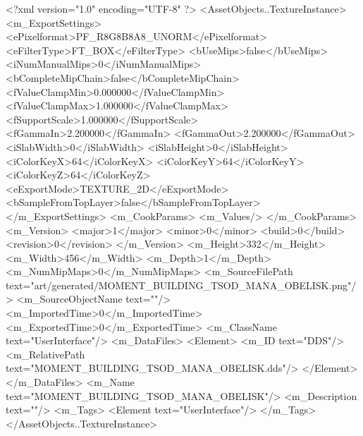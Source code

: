 <?xml version="1.0" encoding="UTF-8" ?>
<AssetObjects..TextureInstance>
	<m_ExportSettings>
		<ePixelformat>PF_R8G8B8A8_UNORM</ePixelformat>
		<eFilterType>FT_BOX</eFilterType>
		<bUseMips>false</bUseMips>
		<iNumManualMips>0</iNumManualMips>
		<bCompleteMipChain>false</bCompleteMipChain>
		<fValueClampMin>0.000000</fValueClampMin>
		<fValueClampMax>1.000000</fValueClampMax>
		<fSupportScale>1.000000</fSupportScale>
		<fGammaIn>2.200000</fGammaIn>
		<fGammaOut>2.200000</fGammaOut>
		<iSlabWidth>0</iSlabWidth>
		<iSlabHeight>0</iSlabHeight>
		<iColorKeyX>64</iColorKeyX>
		<iColorKeyY>64</iColorKeyY>
		<iColorKeyZ>64</iColorKeyZ>
		<eExportMode>TEXTURE_2D</eExportMode>
		<bSampleFromTopLayer>false</bSampleFromTopLayer>
	</m_ExportSettings>
	<m_CookParams>
		<m_Values/>
	</m_CookParams>
	<m_Version>
		<major>1</major>
		<minor>0</minor>
		<build>0</build>
		<revision>0</revision>
	</m_Version>
	<m_Height>332</m_Height>
	<m_Width>456</m_Width>
	<m_Depth>1</m_Depth>
	<m_NumMipMaps>0</m_NumMipMaps>
	<m_SourceFilePath text="art/generated/MOMENT_BUILDING_TSOD_MANA_OBELISK.png"/>
	<m_SourceObjectName text=""/>
	<m_ImportedTime>0</m_ImportedTime>
	<m_ExportedTime>0</m_ExportedTime>
	<m_ClassName text="UserInterface"/>
	<m_DataFiles>
		<Element>
			<m_ID text="DDS"/>
			<m_RelativePath text="MOMENT_BUILDING_TSOD_MANA_OBELISK.dds"/>
		</Element>
	</m_DataFiles>
	<m_Name text="MOMENT_BUILDING_TSOD_MANA_OBELISK"/>
	<m_Description text=""/>
	<m_Tags>
		<Element text="UserInterface"/>
	</m_Tags>
</AssetObjects..TextureInstance>
